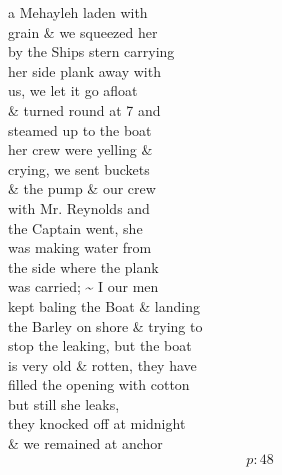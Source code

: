 \documentclass{report}
\begin{document}
	\par{
 	a Mehayleh laden with\ \\grain \& we squeezed her\ \\by the Ships stern carrying\ \\her side plank away with\ \\us, we let it go afloat\ \\\& turned round at 7 and\ \\steamed up to the boat\ \\her crew were yelling \&\ \\crying, we sent buckets\ \\\& the pump \& our crew\ \\with Mr. Reynolds and\ \\the Captain went, she\ \\was making water from\ \\the side where the plank\ \\was carried; \~{} I our men\ \\kept baling the Boat \& landing\ \\the Barley on shore \& trying to\ \\stop the leaking, but the boat\ \\is very old \& rotten, they have\ \\filled the opening with cotton\ \\but still she leaks,\ \\they knocked off at midnight\ \\\& we remained at anchor\ \\
  \[p: 48 \]

	}



\end{document}
